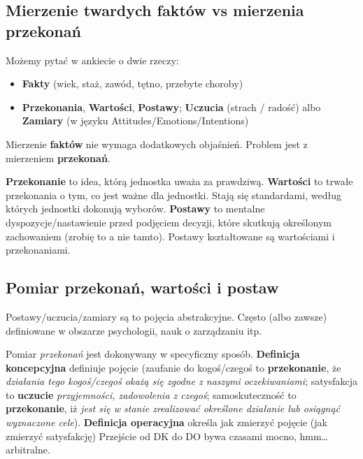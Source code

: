 \documentclass[
  openany]{book}
\begin{document}
\hypertarget{mierzenie-twardych-faktuxf3w-vs-mierzenia-przekonaux144}{%
\subsection{Mierzenie twardych faktów vs mierzenia przekonań}\label{mierzenie-twardych-faktuxf3w-vs-mierzenia-przekonaux144}}

Możemy pytać w ankiecie o dwie rzeczy:

\begin{itemize}
\item
  \textbf{Fakty} (wiek, staż, zawód, tętno, przebyte choroby)
\item
  \textbf{Przekonania}, \textbf{Wartości}, \textbf{Postawy};
  \textbf{Uczucia} (strach / radość) albo \textbf{Zamiary}
  (w języku Attitudes/Emotions/Intentions)
\end{itemize}

Mierzenie \textbf{faktów} nie wymaga dodatkowych objaśnień. Problem jest
z mierzeniem \textbf{przekonań}.

\textbf{Przekonanie} to idea, którą jednostka uważa
za prawdziwą. \textbf{Wartości} to trwałe przekonania o tym,
co jest ważne dla jednostki. Stają się standardami, według których jednostki dokonują wyborów.
\textbf{Postawy} to mentalne dyspozycje/nastawienie
przed podjęciem decyzji, które skutkują
określonym zachowaniem (zrobię to a nie tamto). Postawy
kształtowane są wartościami i przekonaniami.

\hypertarget{pomiar-przekonaux144-wartoux15bci-i-postaw}{%
\subsection{Pomiar przekonań, wartości i postaw}\label{pomiar-przekonaux144-wartoux15bci-i-postaw}}

Postawy/uczucia/zamiary są to pojęcia
abstrakcyjne. Często (albo zawsze) definiowane w obszarze psychologii,
nauk o zarządzaniu itp.

Pomiar \emph{przekonań} jest dokonywany w specyficzny sposób.
\textbf{Definicja koncepcyjna} definiuje pojęcie
(zaufanie do kogoś/czegoś to \textbf{przekonanie}, że
\emph{działania tego kogoś/czegoś okażą się zgodne z naszymi
oczekiwaniami}; satysfakcja to
\textbf{uczucie} \emph{przyjemności, zadowolenia z czegoś};
samoskuteczność to
\textbf{przekonanie}, iż \emph{jest się w stanie zrealizować określone działanie lub osiągnąć wyznaczone cele}).
\textbf{Definicja operacyjna} określa jak zmierzyć pojęcie
(jak zmierzyć satysfakcję)
Przejście od DK do DO bywa czasami mocno, hmm\ldots{} arbitralne.
\end{document}
